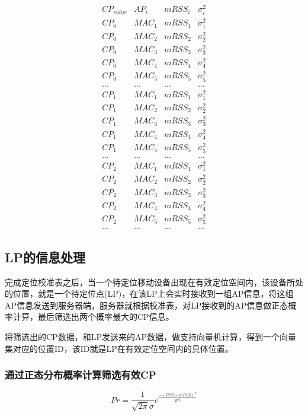 \documentclass[UTF8, twocolumn ]{ctexart}
\begin{document}
\begin{displaymath}
\begin{array}{c|c|c|c}
CP_{value} & AP_{i} & mRSS_{i} & \sigma^{2}_{i} \\ \hline
CP_{0} & MAC_{1} & mRSS_{1} & \sigma^{2}_{1} \\
CP_{0} & MAC_{2} & mRSS_{2} & \sigma^{2}_{2} \\
CP_{0} & MAC_{3} & mRSS_{3} & \sigma^{2}_{3} \\
CP_{0} & MAC_{4} & mRSS_{4} & \sigma^{2}_{4} \\
CP_{0} & MAC_{5} & mRSS_{5} & \sigma^{2}_{5} \\
... & ... & ... & ... \\
CP_{1} & MAC_{1} & mRSS_{1} & \sigma^{2}_{1} \\
CP_{1} & MAC_{2} & mRSS_{2} & \sigma^{2}_{2} \\
CP_{1} & MAC_{3} & mRSS_{3} & \sigma^{2}_{3} \\
CP_{1} & MAC_{4} & mRSS_{4} & \sigma^{2}_{4} \\
CP_{1} & MAC_{5} & mRSS_{5} & \sigma^{2}_{5} \\
... & ... & ... & ... \\
CP_{2} & MAC_{1} & mRSS_{1} & \sigma^{2}_{1} \\
CP_{2} & MAC_{2} & mRSS_{2} & \sigma^{2}_{2} \\
CP_{2} & MAC_{3} & mRSS_{3} & \sigma^{2}_{3} \\
CP_{2} & MAC_{4} & mRSS_{4} & \sigma^{2}_{4} \\
CP_{2} & MAC_{5} & mRSS_{5} & \sigma^{2}_{5} \\
... & ... & ... & ...
\end{array}
\end{displaymath}

\subsection{LP的信息处理}
完成定位校准表之后，当一个待定位移动设备出现在有效定位空间内，该设备所处的位置，就是一个待定位点(LP)，在该LP上会实时接收到一组AP信息，将这组AP信息发送到服务器端，服务器就根据校准表，对LP接收到的AP信息做正态概率计算，最后筛选出两个概率最大的CP信息。
\par
将筛选出的CP数据，和LP发送来的AP数据，做支持向量机计算，得到一个向量集对应的位置ID，该ID就是LP在有效定位空间内的具体位置。
\subsubsection{通过正态分布概率计算筛选有效CP}
\begin{displaymath}
Pr=\frac{1}{\sqrt{2\pi}\sigma}e^{\frac{-(RSS-mRSS)^{2}}{2\sigma^{2}}}
\end{displaymath}
\end{document}
